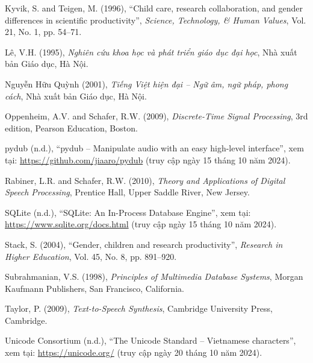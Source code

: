 \begin{list}{}{%
  \sloppy
  \setlength{\leftmargin}{2.0cm}%
  \setlength{\itemindent}{-0.73cm}%
  \setlength{\parsep}{6pt}%
  \setlength{\itemsep}{6pt}%
  \setlength{\topsep}{6pt}%
}
\item Kyvik, S. and Teigen, M. (1996), ``Child care, research collaboration, and gender differences in scientific productivity'', \textit{Science, Technology, \& Human Values}, Vol. 21, No. 1, pp. 54--71.

\item Lê, V.H. (1995), \textit{Nghiên cứu khoa học và phát triển giáo dục đại học}, Nhà xuất bản Giáo dục, Hà Nội.

\item Nguyễn Hữu Quỳnh (2001), \textit{Tiếng Việt hiện đại -- Ngữ âm, ngữ pháp, phong cách}, Nhà xuất bản Giáo dục, Hà Nội.

\item Oppenheim, A.V. and Schafer, R.W. (2009), \textit{Discrete-Time Signal Processing}, 3rd edition, Pearson Education, Boston.

\item pydub (n.d.), ``pydub -- Manipulate audio with an easy high-level interface'', xem tại: \url{https://github.com/jiaaro/pydub} (truy cập ngày 15 tháng 10 năm 2024).

\item Rabiner, L.R. and Schafer, R.W. (2010), \textit{Theory and Applications of Digital Speech Processing}, Prentice Hall, Upper Saddle River, New Jersey.

\item SQLite (n.d.), ``SQLite: An In-Process Database Engine'', xem tại: \url{https://www.sqlite.org/docs.html} (truy cập ngày 15 tháng 10 năm 2024).

\item Stack, S. (2004), ``Gender, children and research productivity'', \textit{Research in Higher Education}, Vol. 45, No. 8, pp. 891--920.

\item Subrahmanian, V.S. (1998), \textit{Principles of Multimedia Database Systems}, Morgan Kaufmann Publishers, San Francisco, California.

\item Taylor, P. (2009), \textit{Text-to-Speech Synthesis}, Cambridge University Press, Cambridge.

\item Unicode Consortium (n.d.), ``The Unicode Standard -- Vietnamese characters'', xem tại: \url{https://unicode.org/} (truy cập ngày 20 tháng 10 năm 2024).

\end{list}

